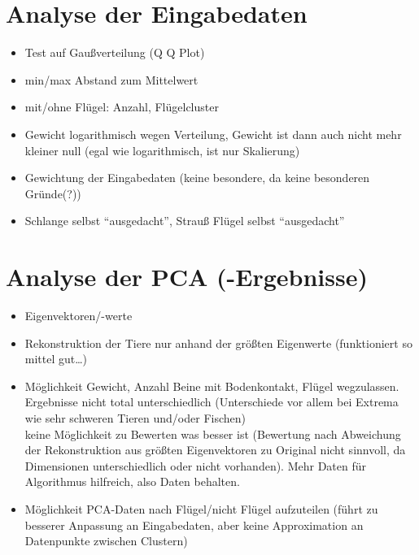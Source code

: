  \section{Analyse der Eingabedaten}
 
 
 \begin{itemize}
  \item Test auf Gaußverteilung (Q Q Plot) 
  \item min/max Abstand zum Mittelwert
  \item mit/ohne Flügel: Anzahl, Flügelcluster
  \item Gewicht logarithmisch wegen Verteilung, Gewicht ist dann auch nicht mehr kleiner null (egal wie logarithmisch, ist nur Skalierung)
  \item Gewichtung der Eingabedaten (keine besondere, da keine besonderen Gründe(?))
  \item Schlange selbst "`ausgedacht"', Strauß Flügel selbst "`ausgedacht"'
 \end{itemize}
 
 
 \section{Analyse der PCA (-Ergebnisse)}

 \begin{itemize}
  \item Eigenvektoren/-werte
  \item Rekonstruktion der Tiere nur anhand der größten Eigenwerte (funktioniert so mittel gut\dots)
  \item Möglichkeit Gewicht, Anzahl Beine mit Bodenkontakt, Flügel wegzulassen. Ergebnisse nicht total unterschiedlich (Unterschiede vor allem bei Extrema wie sehr schweren Tieren und/oder Fischen)\\
  keine Möglichkeit zu Bewerten was besser ist (Bewertung nach Abweichung der Rekonstruktion aus größten Eigenvektoren zu Original nicht sinnvoll, da Dimensionen unterschiedlich oder nicht vorhanden). Mehr Daten für Algorithmus hilfreich, also Daten behalten.
  \item Möglichkeit PCA-Daten nach Flügel/nicht Flügel aufzuteilen (führt zu besserer Anpassung an Eingabedaten, aber keine Approximation an Datenpunkte zwischen Clustern) 
 \end{itemize}
 


